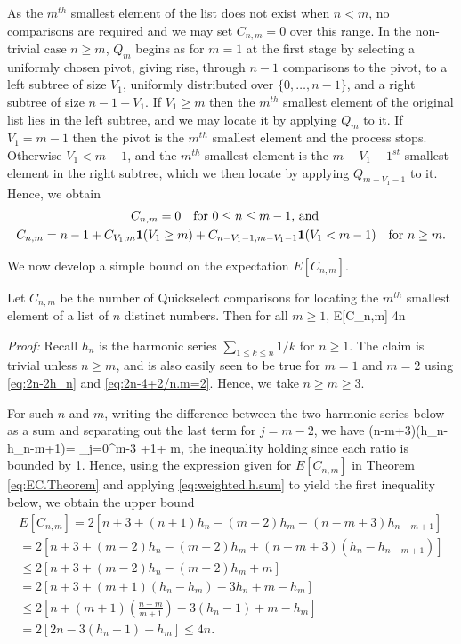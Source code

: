 \documentclass[12pt]{article}
\begin{document}
As the $m^{th}$ smallest element of the list does not exist when $n < m$, no comparisons are required and we may set $C_{n,m}=0$ over this range. 
In the non-trivial case $n \ge m$, $Q_m$ begins as for $m=1$ at the first stage by selecting a uniformly chosen pivot, giving rise, through $n-1$ comparisons to the pivot, to a left subtree of size $V_1$, uniformly distributed over $\{0,\ldots,n-1\}$, and a right subtree of size $n-1-V_1$. If $V_1 \ge m$ then the $m^{th}$ smallest element of the original list lies in the left subtree, and we may locate it by applying $Q_m$ to it. If $V_1=m-1$ then the pivot is the $m^{th}$ smallest element and the process stops. Otherwise $V_1<m-1$, and the $m^{th}$ smallest element is the $m-V_1-1^{st}$ smallest element in the right subtree, which we then locate by applying $Q_{m-V_1-1}$ to it. Hence, we obtain
\begin{multline} \label{eq:Cnm.rec}
C_{n,m}=0 \qmq{for $0 \le n \le m-1$, and} \\
C_{n,m}=n-1 +C_{V_1,m}\textbf{1}(V_1 \ge m) + C_{n-V_1-1,m-V_1-1}\textbf{1}(V_1<m-1)  \qm{for $n \ge m$.}
\end{multline}


We now develop a simple bound on the expectation $E[C_{n,m}]$. 
\begin{lemma} \label{lem:4n}
	Let $C_{n,m}$ be the number of Quickselect comparisons for locating the $m^{th}$ smallest element of a list of $n$ distinct numbers. Then for all $m \ge 1$, 
	\beas %
	E[C_{n,m}] \le 4n 
	\enas
\end{lemma}

\noindent \emph{Proof:} Recall $h_n$ is the harmonic series $\sum_{1 \le k \le n}1/k$ for $n \ge 1$. The claim is trivial unless $n \ge m$, and is also easily seen to be true for $m=1$ and $m=2$ using \eqref{eq:2n-2h_n} and \eqref{eq:2n-4+2/n.m=2}. Hence, we take $n \ge m \ge 3$. 


For such $n$ and $m$, writing the difference between the two harmonic series below as a sum and separating out the last term for $j=m-2$, we have
\bea \label{eq:weighted.h.sum}
(n-m+3)(h_n-h_{n-m+1})= \sum_{j=0}^{m-3} +1+ \le m,
\ena
the inequality holding since each ratio is bounded by 1. Hence, using the expression given for $E[C_{n,m}]$ in Theorem \ref{eq:EC.Theorem} and 
applying \eqref{eq:weighted.h.sum} to yield the first inequality below, we obtain the upper bound
\begin{multline*}
E[C_{n,m}]= 2[n + 3 + (n+1)h_n-(m + 2)h_m-(n-m+3)h_{n-m+1}]  \\
=  2[n + 3 + (m-2)h_n-(m + 2)h_m+(n-m+3)(h_n-h_{n-m+1})]\\
\le 2[n + 3 + (m-2)h_n-(m + 2)h_m+m]\\
=  2[n + 3 + (m+1)(h_n-h_m)-3h_n+m-h_m] \\
\le  2[n + (m+1)\left(\frac{n-m}{m+1}\right)-3(h_n-1)+m-h_m] \\
= 2[2n-3(h_n-1)-h_m] \le 4n. 
\end{multline*}
\bbox
\end{document}
